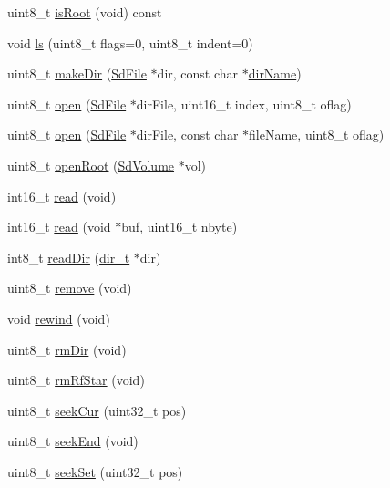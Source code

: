 \begin{DoxyCompactItemize}
uint8\+\_\+t \hyperlink{class_sd_file_a29fd6e80e6cbd3c67724988f9fe02290}{is\+Root} (void) const
\item 
void \hyperlink{class_sd_file_afd9965ed8dee8bdd4d86dd14032edbc0}{ls} (uint8\+\_\+t flags=0, uint8\+\_\+t indent=0)
\item 
uint8\+\_\+t \hyperlink{class_sd_file_a62984bedf614a8de96b48bf9c5e7159f}{make\+Dir} (\hyperlink{class_sd_file}{Sd\+File} $\ast$dir, const char $\ast$\hyperlink{class_sd_file_ad7bbb106aa4c96c795c88b33def677bc}{dir\+Name})
\item 
uint8\+\_\+t \hyperlink{class_sd_file_a9e211ac14784f48aebb213194336f8cc}{open} (\hyperlink{class_sd_file}{Sd\+File} $\ast$dir\+File, uint16\+\_\+t index, uint8\+\_\+t oflag)
\item 
uint8\+\_\+t \hyperlink{class_sd_file_a3cf2167ad5ba6d84942ede8d2d07dcc6}{open} (\hyperlink{class_sd_file}{Sd\+File} $\ast$dir\+File, const char $\ast$file\+Name, uint8\+\_\+t oflag)
\item 
uint8\+\_\+t \hyperlink{class_sd_file_ac3612bc27eaf52a23d8cb85c8d96ad38}{open\+Root} (\hyperlink{class_sd_volume}{Sd\+Volume} $\ast$vol)
\item 
int16\+\_\+t \hyperlink{class_sd_file_a6c389f0180b4a86fb6d7464f50d3b0dd}{read} (void)
\item 
int16\+\_\+t \hyperlink{class_sd_file_a77ad85c5c80b34f8ebc57b5b89730554}{read} (void $\ast$buf, uint16\+\_\+t nbyte)
\item 
int8\+\_\+t \hyperlink{class_sd_file_ab240540b099cedcfe8b93b5e853d0628}{read\+Dir} (\hyperlink{_fat_structs_8h_a803db59d4e16a0c54a647afc6a7954e3}{dir\+\_\+t} $\ast$dir)
\item 
uint8\+\_\+t \hyperlink{class_sd_file_a66c5fb5f651a1ac319bab68fda1d3cc2}{remove} (void)
\item 
void \hyperlink{class_sd_file_afa8aaa7bdeb97b4e691ea01adf99f654}{rewind} (void)
\item 
uint8\+\_\+t \hyperlink{class_sd_file_a0d9e0c280b3469bb15e7258f6339746b}{rm\+Dir} (void)
\item 
uint8\+\_\+t \hyperlink{class_sd_file_a44c26fddfe2b42e7db3bc80290c77503}{rm\+Rf\+Star} (void)
\item 
uint8\+\_\+t \hyperlink{class_sd_file_aa95121ff038538e671f125160b280e9a}{seek\+Cur} (uint32\+\_\+t pos)
\item 
uint8\+\_\+t \hyperlink{class_sd_file_afa70bc7ba5eb789aee1b62fc5fafaa5b}{seek\+End} (void)
\item 
uint8\+\_\+t \hyperlink{class_sd_file_a5b8ea0ba6a9fec1ee8f1b11e90edb0c6}{seek\+Set} (uint32\+\_\+t pos)

\end{DoxyCompactItemize}
